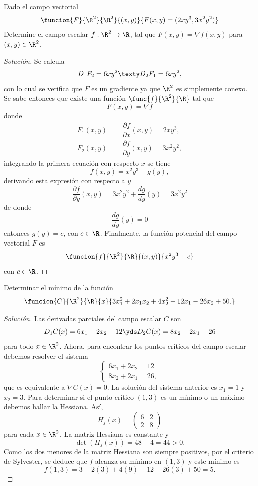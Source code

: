 \documentclass[a4,11pt]{aleph-notas}
\begin{document}
\begin{ejer}
Dado el campo vectorial
    \[
        \funcion{F}{\R^2}{\R^2}{(x,y)}{F(x,y)=(2xy^3,3x^2 y^2)}
    \]
    Determine el campo escalar $f:\R^2\rightarrow \R$, tal que $F(x,y)=\nabla f(x,y)$ para $(x,y)\in\R^2$.
\end{ejer}

\begin{proof}[Solución]
Se calcula
    \[
        D_1F_2=6xy^2 \texty D_2F_1=6xy^2,
    \]
    con lo cual se verifica que $F$ es un gradiente ya que $\R^2$ es simplemente conexo. Se sabe entonces que existe una función $\func{f}{\R^2}{\R}$ tal que \[
        F(x,y)=\nabla f
    \]
    donde
    \begin{align*}
         F_1(x,y)&=\dfrac{\partial f}{\partial x}(x,y)=2xy^3,\\
         F_2(x,y)&=\dfrac{\partial f}{\partial y}(x,y)=3x^2y^2,
    \end{align*}
    integrando la primera ecuación con respecto $x$ se tiene
    \[
        f(x,y)=x^2y^3+g(y),
    \]
    derivando esta expresión con respecto a $y$
    \[
        \dfrac{\partial f}{\partial y}(x,y)=3x^2y^2+\dfrac{dg}{dy}(y)=3x^2y^2
    \]
    de donde 
    \[
        \dfrac{dg}{dy}(y)=0
    \]
    entonces $g(y)=c$, con $c\in\R$.
    Finalmente, la función potencial del campo vectorial $F$ es
    \[
        \funcion{f}{\R^2}{\R}{(x,y)}{x^2y^3+c}
    \]
    con $c\in\R$.
\end{proof}

\begin{ejer}
Determinar el mínimo de la función
	\[
	    \funcion{C}{\R^2}{\R}{x}
	    {3x_1^2+2x_1x_2+4x_2^2-12x_1-26x_2+50.}
	\]
\end{ejer}

\begin{proof}[Solución]
Las derivadas parciales del campo escalar $C$ son
	\[
		D_1 C(x)=6x_1+2x_2-12\yds 
		D_2 C(x)=8x_2+2x_1-26
	\]
	para todo $x\in\R^2$. Ahora, para encontrar los puntos críticos del campo escalar debemos resolver el sistema
	\[
		\begin{cases}
		6x_1+2x_2=12\\
		8x_2+2x_1=26,
		\end{cases}
	\]
	que es equivalente a $\nabla C(x)=0$. La solución del sistema anterior es $x_1= 1$ y $x_2=3$. Para determinar si el punto crítico $(1,3)$ es un mínimo o un máximo debemos hallar la Hessiana. Así,
	\[
		H_f(x)=
			\begin{pmatrix}
				6&2\\
				2&8
			\end{pmatrix}
	\]
	para cada $x\in\R^2$. La matriz Hessiana es constante y 
	\[
		\det(H_f(x))=48-4=44>0.
	\]
	Como los dos menores de la matriz Hessiana son siempre positivos, por el criterio de Sylvester, se deduce que $f$ alcanza su mínimo en $(1,3)$ y este mínimo es
	\[
		f(1,3)=3+2(3)+4(9)-12-26(3)+50=5.
	\]
\end{proof}
\end{document}
